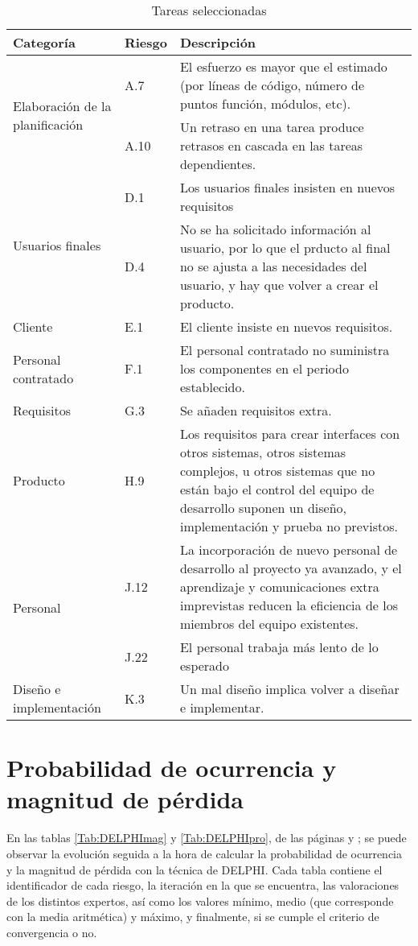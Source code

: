 \documentclass[11pt,a4paper,spanish,twoside]{report}
\begin{document}
\begin{table}[!ht]
  \centering
  \begin{tabular}{|p{3.5cm}||p{1.1cm}|p{6.3cm}|}
    \hline
    \textbf{Categoría} & \textbf{Riesgo} & \textbf{Descripción} \\
    \hline\hline
    \multirow{2}{3.5cm}{Elaboración de la planificación}
    & A.7 & El esfuerzo es mayor que el estimado (por líneas de código,
    número de puntos función, módulos, etc). \\  
    & A.10 & Un retraso en una tarea produce retrasos en cascada en las
    tareas dependientes. \\
    \hline
    \multirow{2}{3cm}{Usuarios finales}
    & D.1 & Los usuarios finales insisten en nuevos requisitos\\
    & D.4 & No se ha solicitado información al usuario, por lo que el prducto
    al final  no se ajusta a las necesidades del usuario, y hay que volver a
    crear el producto.\\
    \hline
    Cliente& E.1 & El cliente insiste en nuevos requisitos.\\
    \hline
    Personal contratado & F.1 & El personal contratado no suministra los
    componentes en el periodo establecido.\\
    \hline
    Requisitos& G.3 & Se añaden requisitos extra.\\
    \hline
    Producto & H.9 &  Los requisitos para crear interfaces con otros
    sistemas, otros sistemas complejos, u otros sistemas que no están bajo el
    control del equipo de desarrollo suponen un diseño, implementación y
    prueba no previstos.\\ 
    \hline
    \multirow{2}{3.5cm}{Personal}
    & J.12 & La incorporación de nuevo personal de desarrollo al proyecto ya
    avanzado, y el aprendizaje y comunicaciones extra imprevistas reducen la
    eficiencia de los miembros del equipo existentes.\\ 
    & J.22 & El personal trabaja más lento de lo esperado\\
    \hline
    \multirow{1}{3.5cm}{Diseño e implementación}
    & K.3 & Un mal diseño implica volver a diseñar e implementar.\\
   \hline
  \end{tabular}
  \caption{Tareas seleccionadas}
  \label{Tab:tar_sel}
\end{table}

\chapter{Probabilidad de ocurrencia y magnitud de pérdida} 
En las tablas \ref{Tab:DELPHImag} y \ref{Tab:DELPHIpro}, de las páginas
\pageref{Tab:DELPHImag} y \pageref{Tab:DELPHIpro}; se  
puede observar la evolución seguida a la hora de calcular la probabilidad de
ocurrencia y la magnitud de pérdida con la técnica de DELPHI. Cada tabla
contiene el identificador de cada riesgo, la iteración en 
la que se encuentra, las valoraciones de los distintos expertos, así como los
valores mínimo, medio (que
corresponde con la media aritmética) y máximo, y finalmente, si se cumple el
criterio de convergencia o no. 
\end{document}

